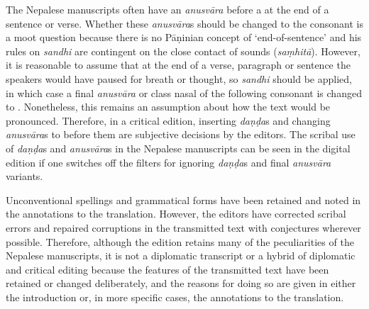 
The Nepalese manuscripts often have an \emph{anusvāra} before a 
 at the end of a sentence or verse. Whether these 
\emph{anusvāra}s should be changed to the consonant  is a moot 
question because there is no Pāṇinian concept of `end-of-sentence' and his rules 
on \emph{sandhi} are contingent on the close contact of  sounds 
(\emph{saṃhitā}). However, it is reasonable to assume that at the end 
of a verse, paragraph or sentence the speakers would have paused for breath or 
thought, so \emph{sandhi} should be applied, in which case a final 
\emph{anusvāra} or class nasal of the following consonant is changed to 
.  Nonetheless, this remains an assumption about how the text would 
be pronounced. Therefore, in a critical edition, inserting \emph{daṇḍa}s and 
changing \emph{anusvāra}s to  before them are subjective decisions 
by the editors. The scribal use of \emph{daṇḍa}s and \emph{anusvāra}s in the 
Nepalese manuscripts can be seen in the digital edition if one switches off the 
filters for ignoring \emph{daṇḍa}s and final \emph{anusvāra} variants. 

Unconventional spellings and grammatical forms have been retained and noted in 
the annotations to the translation. However, the editors have corrected scribal 
errors and repaired corruptions in the transmitted text with conjectures wherever 
possible. Therefore, although the edition retains many of the peculiarities of the 
Nepalese manuscripts, it is not a diplomatic transcript or a hybrid of diplomatic 
and critical editing because the features of the transmitted text have been 
retained or changed deliberately, and the reasons for doing so are given in either 
the introduction or, in more specific cases, the annotations to the translation.

